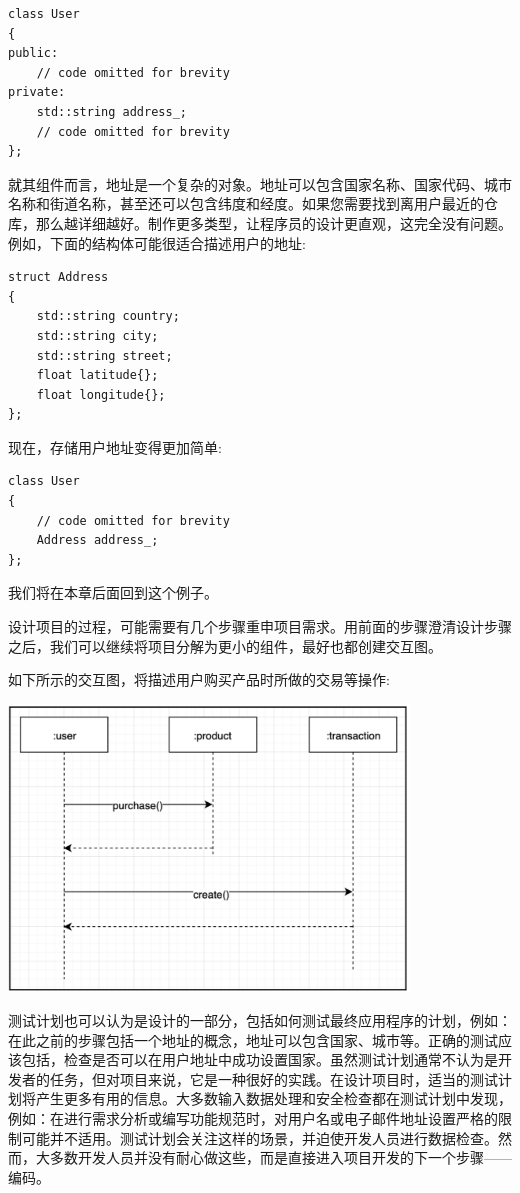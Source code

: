 \begin{lstlisting}[caption={}]
class User
{
public:
	// code omitted for brevity
private:
	std::string address_;
	// code omitted for brevity
};
\end{lstlisting}

就其组件而言，地址是一个复杂的对象。地址可以包含国家名称、国家代码、城市名称和街道名称，甚至还可以包含纬度和经度。如果您需要找到离用户最近的仓库，那么越详细越好。制作更多类型，让程序员的设计更直观，这完全没有问题。例如，下面的结构体可能很适合描述用户的地址: \par

\begin{lstlisting}[caption={}]
struct Address
{
	std::string country;
	std::string city;
	std::string street;
	float latitude{};
	float longitude{};
};
\end{lstlisting}

现在，存储用户地址变得更加简单: \par

\begin{lstlisting}[caption={}]
class User
{
	// code omitted for brevity
	Address address_;
};
\end{lstlisting}
我们将在本章后面回到这个例子。 \par
设计项目的过程，可能需要有几个步骤重申项目需求。用前面的步骤澄清设计步骤之后，我们可以继续将项目分解为更小的组件，最好也都创建交互图。 \par
如下所示的交互图，将描述用户购买产品时所做的交易等操作: \par

\begin{center}
	\includegraphics[width=0.8\textwidth]{content/Section-2/Chapter-10/3}
\end{center}

测试计划也可以认为是设计的一部分，包括如何测试最终应用程序的计划，例如：在此之前的步骤包括一个地址的概念，地址可以包含国家、城市等。正确的测试应该包括，检查是否可以在用户地址中成功设置国家。虽然测试计划通常不认为是开发者的任务，但对项目来说，它是一种很好的实践。在设计项目时，适当的测试计划将产生更多有用的信息。大多数输入数据处理和安全检查都在测试计划中发现，例如：在进行需求分析或编写功能规范时，对用户名或电子邮件地址设置严格的限制可能并不适用。测试计划会关注这样的场景，并迫使开发人员进行数据检查。然而，大多数开发人员并没有耐心做这些，而是直接进入项目开发的下一个步骤——编码。 \par


